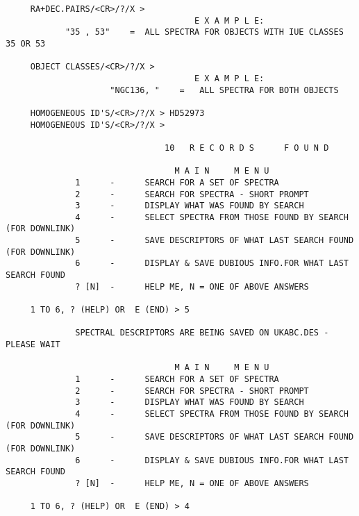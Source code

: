 \begin{footnotesize}
\begin{verbatim}
     RA+DEC.PAIRS/<CR>/?/X >
                                      E X A M P L E:
            "35 , 53"    =  ALL SPECTRA FOR OBJECTS WITH IUE CLASSES 35 OR 53

     OBJECT CLASSES/<CR>/?/X >
                                      E X A M P L E:
                     "NGC136, "    =   ALL SPECTRA FOR BOTH OBJECTS

     HOMOGENEOUS ID'S/<CR>/?/X > HD52973
     HOMOGENEOUS ID'S/<CR>/?/X >

                                10   R E C O R D S      F O U N D

                                  M A I N     M E N U
              1      -      SEARCH FOR A SET OF SPECTRA
              2      -      SEARCH FOR SPECTRA - SHORT PROMPT
              3      -      DISPLAY WHAT WAS FOUND BY SEARCH
              4      -      SELECT SPECTRA FROM THOSE FOUND BY SEARCH (FOR DOWNLINK)
              5      -      SAVE DESCRIPTORS OF WHAT LAST SEARCH FOUND (FOR DOWNLINK)
              6      -      DISPLAY & SAVE DUBIOUS INFO.FOR WHAT LAST SEARCH FOUND
              ? [N]  -      HELP ME, N = ONE OF ABOVE ANSWERS

     1 TO 6, ? (HELP) OR  E (END) > 5

              SPECTRAL DESCRIPTORS ARE BEING SAVED ON UKABC.DES - PLEASE WAIT

                                  M A I N     M E N U
              1      -      SEARCH FOR A SET OF SPECTRA
              2      -      SEARCH FOR SPECTRA - SHORT PROMPT
              3      -      DISPLAY WHAT WAS FOUND BY SEARCH
              4      -      SELECT SPECTRA FROM THOSE FOUND BY SEARCH (FOR DOWNLINK)
              5      -      SAVE DESCRIPTORS OF WHAT LAST SEARCH FOUND (FOR DOWNLINK)
              6      -      DISPLAY & SAVE DUBIOUS INFO.FOR WHAT LAST SEARCH FOUND
              ? [N]  -      HELP ME, N = ONE OF ABOVE ANSWERS

     1 TO 6, ? (HELP) OR  E (END) > 4


\end{verbatim}
\end{footnotesize}
